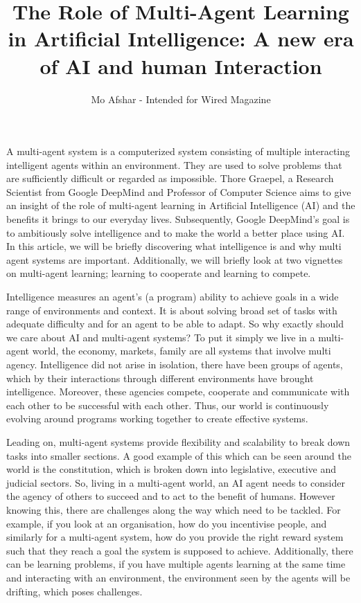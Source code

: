 \documentclass[11pt]{article} %
\title{The Role of Multi-Agent Learning in Artificial Intelligence: A new era of AI and human Interaction}
\author{Mo Afshar - Intended for Wired Magazine}
\begin{document}
\maketitle
A multi-agent system is a computerized system consisting of multiple interacting intelligent agents within an environment. They are used to solve problems that are sufficiently difficult or regarded as impossible. Thore Graepel, a Research Scientist from Google DeepMind and Professor of Computer Science aims to give an insight of the role of multi-agent learning in Artificial Intelligence (AI) and the benefits it brings to our everyday lives. Subsequently, Google DeepMind’s goal is to ambitiously solve intelligence and to make the world a better place using AI. In this article, we will be briefly discovering what intelligence is and why multi agent systems are important. Additionally, we will briefly look at two vignettes on multi-agent learning; learning to cooperate and learning to compete.  
\par

Intelligence measures an agent’s (a program) ability to achieve goals in a wide range of environments and context. It is about solving broad set of tasks with adequate difficulty and for an agent to be able to adapt. So why exactly should we care about AI and multi-agent systems? To put it simply we live in a multi-agent world, the economy, markets, family are all systems that involve multi agency. Intelligence did not arise in isolation, there have been groups of agents, which by their interactions through different environments have brought intelligence. Moreover, these agencies compete, cooperate and communicate with each other to be successful with each other. Thus, our world is continuously evolving around programs working together to create effective systems.    
\par

Leading on, multi-agent systems provide flexibility and scalability to break down tasks into smaller sections. A good example of this which can be seen around the world is the constitution, which is broken down into legislative, executive and judicial sectors. So, living in a multi-agent world, an AI agent needs to consider the agency of others to succeed and to act to the benefit of humans. However knowing this, there are challenges along the way which need to be tackled. For example, if you look at an organisation, how do you incentivise people, and similarly for a multi-agent system, how do you provide the right reward system such that they reach a goal the system is supposed to achieve. Additionally, there can be learning problems, if you have multiple agents learning at the same time and interacting with an environment, the environment seen by the agents will be drifting, which poses challenges.   
\par
\end{document}
